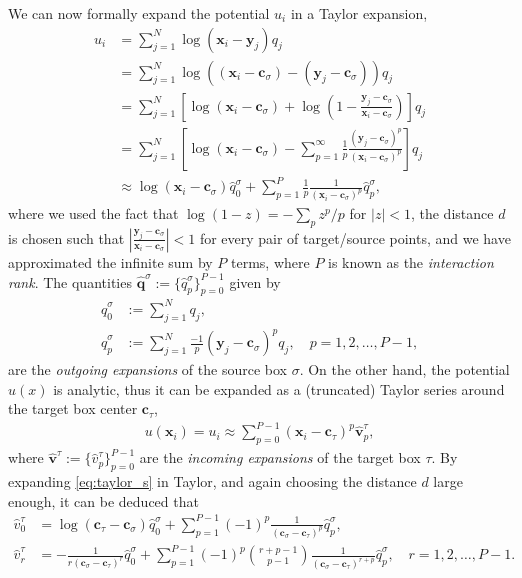 \documentclass[final,onefignum,onetabnum]{siamart220329}
\newcommand{\bol}{\boldsymbol}
\newcommand{\abs}[1]{\left|#1\right|}
\begin{document}
We can now formally expand the potential $u_i$ in a Taylor expansion,
\begin{equation}
\begin{aligned}
		u_i &= \sum_{j=1}^{N} \log(\bol x_i-\bol y_j)q_j\\
	&= \sum_{j=1}^{N} \log((\bol x_i-\bol c_\sigma)-(\bol y_j-\bol c_\sigma))q_j\\
	&= \sum_{j=1}^{N} \left[\log(\bol x_i-\bol c_\sigma) + \log\left(1-\frac{\bol y_j-\bol c_\sigma}{\bol x_i-\bol c_\sigma}\right)\right]q_j\\
	&= \sum_{j=1}^{N} \left[\log(\bol x_i-\bol c_\sigma) -\sum_{p=1}^\infty \frac{1}{p} \frac{(\bol y_j-\bol c_\sigma)^p}{(\bol x_i-\bol c_\sigma)^p}\right]q_j\\
	&\approx \log(\bol x_i-\bol c_\sigma)\hat{q}_0^\sigma +\sum_{p=1}^P \frac{1}{p} \frac{1}{(\bol x_i-\bol c_\sigma)^p}\hat{q}_p^\sigma,
\end{aligned}\label{eq:taylor_s}
\end{equation}
where we used the fact that $\log(1-z) = -\sum_p z^p/p$ for $\abs{z}< 1$, the distance $d$ is chosen such that $\abs{\tfrac{\bol y_j-\bol c_\sigma}{\bol x_i-\bol c_\sigma}} < 1$ for every pair of target/source points, and we have approximated the infinite sum by $P$ terms, where $P$ is known as the \textit{interaction rank}. The quantities $\bol{\hat{q}}^\sigma := \{{\hat{q}}_p^\sigma\}_{p=0}^{P-1}$ given by
\begin{equation}
	\begin{aligned}
	\hat{q}_0^\sigma &:= \sum_{j=1}^N q_j,\\
	\hat{q}_p^\sigma &:= \sum_{j=1}^N \frac{-1}{p}(\bol y_j-\bol c_\sigma)^p q_j, \quad p=1,2,\dots,P-1,
	\end{aligned}\label{eq:qhat}
\end{equation}
are the \textit{outgoing expansions} of the source box $\sigma$. On the other hand, the potential $u(x)$ is analytic, thus it can be expanded as a (truncated) Taylor series around the target box center $\bol c_\tau$, 
\begin{align}
u(\bol x_i) = u_i \approx \sum_{p=0}^{P-1}(\bol x_i-\bol c_\tau)^p\bol{\hat{v}}_p^\tau,\label{eq:Ttfi}
\end{align}
where $\bol{\hat{v}}^\tau := \{{\hat{v}}_p^\tau\}_{p=0}^{P-1}$ are the \textit{incoming expansions} of the target box $\tau$. By expanding \cref{eq:taylor_s} in Taylor, and again choosing the distance $d$ large enough, it can be deduced that 
\begin{equation}
	\begin{aligned}
		\hat{v}_0^\tau &= \log(\bol c_\tau-\bol c_\sigma)\hat{q}_0^\sigma + \sum_{p=1}^{P-1}(-1)^p\frac{1}{(\bol c_\sigma-\bol c_\tau)^p} \hat{q}_p^\sigma,\\
		\hat{v}_r^\tau &= -\frac{1}{r(\bol c_\sigma-\bol c_\tau)^r}\hat{q}_0^\sigma + \sum_{p=1}^{P-1}(-1)^p\binom{r+p-1}{p-1}\frac{1}{(\bol c_\sigma-\bol c_\tau)^{r+p}} \hat{q}_p^\sigma, \quad r=1,2,\dots,P-1.
	\end{aligned}\label{eq:vhat}
\end{equation}
\end{document}
